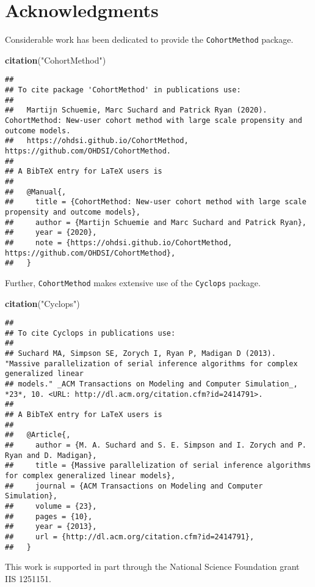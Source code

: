 \documentclass[
]{article}
\newenvironment{Shaded}{\begin{snugshade}}{\end{snugshade}}
\newcommand{\KeywordTok}[1]{\textcolor[rgb]{0.13,0.29,0.53}{\textbf{#1}}}
\newcommand{\NormalTok}[1]{#1}
\newcommand{\StringTok}[1]{\textcolor[rgb]{0.31,0.60,0.02}{#1}}
\begin{document}
\hypertarget{acknowledgments}{%
\section{Acknowledgments}\label{acknowledgments}}

Considerable work has been dedicated to provide the
\texttt{CohortMethod} package.

\begin{Shaded}
\begin{Highlighting}[]
\KeywordTok{citation}\NormalTok{(}\StringTok{"CohortMethod"}\NormalTok{)}
\end{Highlighting}
\end{Shaded}

\begin{verbatim}
## 
## To cite package 'CohortMethod' in publications use:
## 
##   Martijn Schuemie, Marc Suchard and Patrick Ryan (2020). CohortMethod: New-user cohort method with large scale propensity and outcome models.
##   https://ohdsi.github.io/CohortMethod, https://github.com/OHDSI/CohortMethod.
## 
## A BibTeX entry for LaTeX users is
## 
##   @Manual{,
##     title = {CohortMethod: New-user cohort method with large scale propensity and outcome models},
##     author = {Martijn Schuemie and Marc Suchard and Patrick Ryan},
##     year = {2020},
##     note = {https://ohdsi.github.io/CohortMethod, https://github.com/OHDSI/CohortMethod},
##   }
\end{verbatim}

Further, \texttt{CohortMethod} makes extensive use of the
\texttt{Cyclops} package.

\begin{Shaded}
\begin{Highlighting}[]
\KeywordTok{citation}\NormalTok{(}\StringTok{"Cyclops"}\NormalTok{)}
\end{Highlighting}
\end{Shaded}

\begin{verbatim}
## 
## To cite Cyclops in publications use:
## 
## Suchard MA, Simpson SE, Zorych I, Ryan P, Madigan D (2013). "Massive parallelization of serial inference algorithms for complex generalized linear
## models." _ACM Transactions on Modeling and Computer Simulation_, *23*, 10. <URL: http://dl.acm.org/citation.cfm?id=2414791>.
## 
## A BibTeX entry for LaTeX users is
## 
##   @Article{,
##     author = {M. A. Suchard and S. E. Simpson and I. Zorych and P. Ryan and D. Madigan},
##     title = {Massive parallelization of serial inference algorithms for complex generalized linear models},
##     journal = {ACM Transactions on Modeling and Computer Simulation},
##     volume = {23},
##     pages = {10},
##     year = {2013},
##     url = {http://dl.acm.org/citation.cfm?id=2414791},
##   }
\end{verbatim}

This work is supported in part through the National Science Foundation
grant IIS 1251151.
\end{document}
